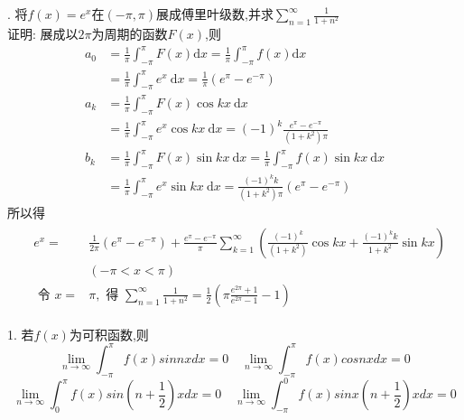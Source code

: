 \documentclass{ctexart}
\begin{document}
\begin{tcolorbox}[title = {求和问题},colbacktitle=red!35!white,colback=white,arc = 3mm, outer arc = 3mm,fonttitle = \itshape, fontupper = \itshape, fontlower = \itshape]
. 将$f(x)=e^x$在$\left(-\pi , \pi \right) $展成傅里叶级数,并求$\displaystyle{\sum_{n=1}^{\infty}\frac{1}{1+n^2}}$\\
  {\color{red}证明:} 展成以$2\pi$为周期的函数$F(x)$,则
       $$
       \begin{aligned}
       	a_{0} &=\frac{1}{\pi} \int_{-\pi}^{\pi} F(x) \mathrm{d} x=\frac{1}{\pi} \int_{-\pi}^{\pi} f(x) \mathrm{d} x \\
       	&=\frac{1}{\pi} \int_{-\pi}^{\pi} e^{x} \mathrm{~d} x=\frac{1}{\pi}\left(e^{\pi}-e^{-\pi}\right) \\
       	a_{k} &=\frac{1}{\pi} \int_{-\pi}^{\pi} F(x) \cos k x \mathrm{~d} x \\
       	&=\frac{1}{\pi} \int_{-\pi}^{\pi} e^{x} \cos k x \mathrm{~d} x=(-1)^{k} \frac{e^{\pi}-e^{-\pi}}{\left(1+k^{2}\right) \pi} \\
       	b_{k} &=\frac{1}{\pi} \int_{-\pi}^{\pi} F(x) \sin k x \mathrm{~d} x=\frac{1}{\pi} \int_{-\pi}^{\pi} f(x) \sin k x \mathrm{~d} x \\
       	&=\frac{1}{\pi} \int_{-\pi}^{\pi} e^{x} \sin k x \mathrm{~d} x=\frac{(-1)^{k} k}{\left(1+k^{2}\right) \pi}\left(e^{\pi}-e^{-\pi}\right)
       \end{aligned}
       $$
       所以得
       $$
       \begin{aligned}
       	&\begin{aligned}
       		e^{x}=& \frac{1}{2 \pi}\left(e^{\pi}-e^{-\pi}\right) 
       		+ \frac{e^{\pi}-e^{-\pi}}{\pi} \sum_{k=1}^{\infty}\left(\frac{(-1)^{k}}{\left(1+k^{2}\right)} \cos k x+\frac{(-1)^{k} k}{1+k^{2}} \sin k x\right) \\
       		&(-\pi<x<\pi) \\
       		\text { 令 } x=& \pi, \text { 得 } \sum_{n=1}^{\infty} \frac{1}{1+n^{2}}=\frac{1}{2}\left(\pi \frac{e^{2 \pi}+1}{e^{2 \pi}-1}-1\right)
       	\end{aligned}
       \end{aligned}
       $$
  
\end{tcolorbox}
\begin{tcolorbox}[title = {$Reimann$引理},colbacktitle=blue!85!white,colback=white,arc = 3mm, outer arc = 3mm,fonttitle = \itshape, fontupper = \itshape, fontlower = \itshape]
	1. 若$f(x)$为可积函数,则$$\lim_{n \to \infty}\int_{-\pi}^{\pi}f(x)sinnxdx=0 \quad \lim_{n \to \infty}\int_{-\pi}^{\pi}f(x)cosnxdx=0 $$
$$\lim_{n \to \infty}\int_{0}^{\pi}f(x)sin\left(n+\frac{1}{2} \right)xdx=0 \quad \lim_{n \to \infty}\int_{-\pi}^{0}f(x)sinx\left(n+\frac{1}{2} \right) xdx=0 $$
\end{tcolorbox}
\end{document}
